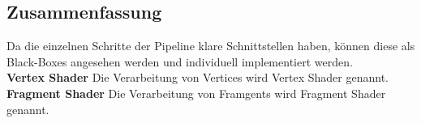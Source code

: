 \documentclass[12pt]{article}
\begin{document}
	\subsection{Zusammenfassung}
	Da die einzelnen Schritte der Pipeline klare Schnittstellen haben, können diese als Black-Boxes angesehen werden und individuell implementiert werden.\\
	\textbf{Vertex Shader} Die Verarbeitung von Vertices wird Vertex Shader genannt.\\
	\textbf{Fragment Shader} Die Verarbeitung von Framgents wird Fragment Shader genannt.



\end{document}
